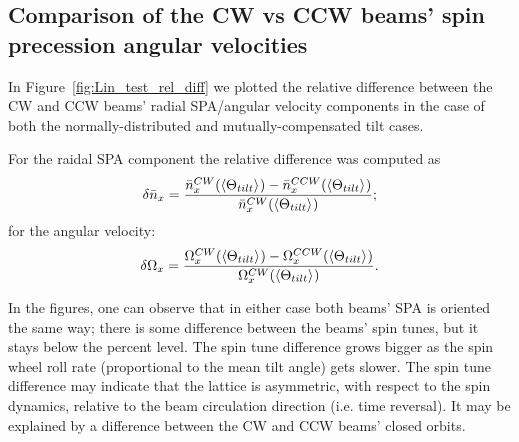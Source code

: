 \subsection{Comparison of the CW vs CCW beams' spin precession angular velocities}\label{chpt3:imperfections:CW_vs_CCW}
In Figure~\ref{fig:Lin_test_rel_diff} we plotted the relative difference between the CW and CCW beams' radial SPA/angular velocity
components in the case of both the normally-distributed and mutually-compensated tilt cases.

For the raidal SPA component the relative difference was computed as
\[
\delta\bar n_x = \frac{\bar n_x^{CW}(\avg{\Theta_{tilt}}) - \bar n_x^{CCW}(\avg{\Theta_{tilt}})}{\bar n_x^{CW}(\avg{\Theta_{tilt}})};
\]
for the angular velocity:
\[
\delta\W_x = \frac{\W_x^{CW}(\avg{\Theta_{tilt}}) - \W_x^{CCW}(\avg{\Theta_{tilt}})}{\W_x^{CW}(\avg{\Theta_{tilt}})}.
\]

In the figures, one can observe that in either case both beams' SPA is oriented the same way; 
there is some difference between the beams' spin tunes, but it stays below the percent level. 
The spin tune difference grows bigger as the
spin wheel roll rate (proportional to the mean tilt angle) gets slower. 
The spin tune difference may indicate that
the lattice is asymmetric, with respect to the spin dynamics, relative to the beam circulation direction (i.e. time reversal).
It may be explained by a difference between the CW and CCW beams' closed orbits.


